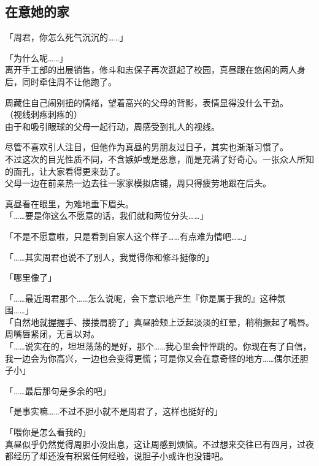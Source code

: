 \subsection{在意她的家}

「周君，你怎么死气沉沉的……」

「为什么呢……」\\

离开手工部的出展销售，修斗和志保子再次逛起了校园，真昼跟在悠闲的两人身后，同时牵住周不让他跑了。

周藏住自己闹别扭的情绪，望着高兴的父母的背影，表情显得没什么干劲。\\

（视线刺疼刺疼的）\\

由于和吸引眼球的父母一起行动，周感受到扎人的视线。

尽管不喜欢引人注目，但他作为真昼的男朋友过日子，其实也渐渐习惯了。\\

不过这次的目光性质不同，不含嫉妒或是恶意，而是充满了好奇心。一张众人所知的面孔，让大家看得更来劲了。\\

父母一边在前亲热一边去往一家家模拟店铺，周只得疲劳地跟在后头。

真昼看在眼里，为难地垂下眉头。\\

「……要是你这么不愿意的话，我们就和两位分头……」

「不是不愿意啦，只是看到自家人这个样子……有点难为情吧……」

「……其实周君也说不了别人，我觉得你和修斗挺像的」

「哪里像了」

「……最近周君那个……怎么说呢，会下意识地产生『你是属于我的』这种氛围……」\\

「自然地就握握手、搂搂肩膀了」真昼脸颊上泛起淡淡的红晕，稍稍撅起了嘴唇。周嘴唇紧闭，无言以对。\\

「……说实在的，坦坦荡荡的是好，那个……我心里会怦怦跳的。你现在有了自信，我一边会为你高兴，一边也会变得更慌；可是你又会在意奇怪的地方……偶尔还胆子小」

「……最后那句是多余的吧」

「是事实嘛……不过不胆小就不是周君了，这样也挺好的」

「喂你是怎么看我的」\\

真昼似乎仍然觉得周胆小没出息，这让周感到烦恼。不过想来交往已有四月，过夜都经历了却还没有积累任何经验，说胆子小或许也没错吧。

